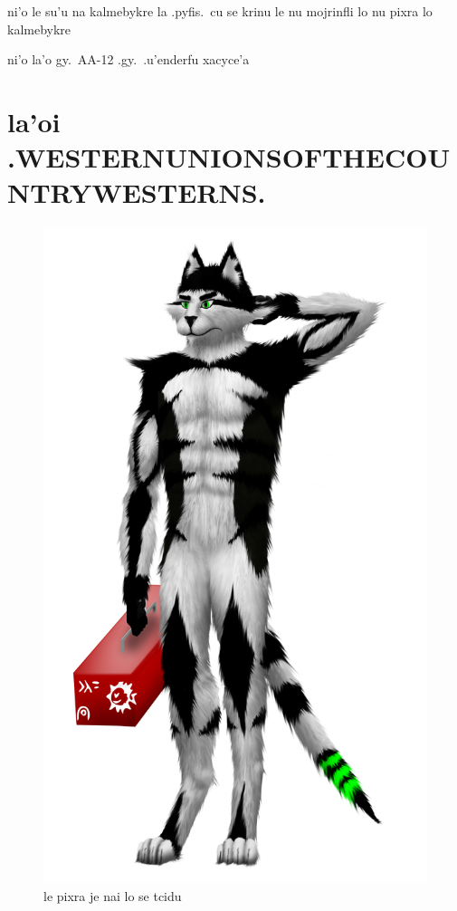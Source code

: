 \documentclass{report}
\begin{document}
ni'o le su'u na kalmebykre la .pyfis.\ cu se krinu le nu mojrinfli lo nu pixra lo kalmebykre

ni'o la'o gy.\ AA-12 .gy.\ .u'enderfu xacyce'a

\chapter{la'oi .WESTERNUNIONSOFTHECOUNTRYWESTERNS.}
\begin{figure}[ht]
	\centering
	\includegraphics[keepaspectratio, width=\textwidth, height=0.75\textheight]{50x/toolbox/westernunionsofthecountrywesterns.png}
	\caption[center]{le pixra je nai lo se tcidu}
\end{figure}
\end{document}
